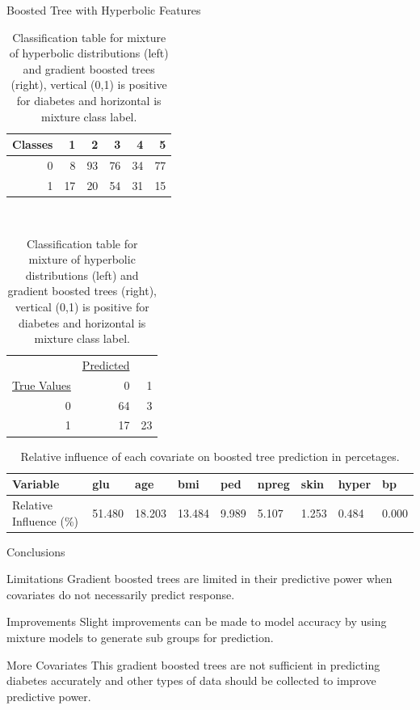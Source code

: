 \documentclass{beamer}
\begin{document}
\begin{frame}{Boosted Tree with Hyperbolic Features}
\begin{tiny}
\begin{table}
\label{classTable}
\caption{Classification table for mixture of hyperbolic distributions (left) and gradient boosted trees (right), vertical (0,1) is positive for diabetes and horizontal is mixture class label.}
\vspace{8pt}
\centering
\begin{tabular}{|r|rrrrr|}
\hline\hline
Classes & 1  & 2  & 3  & 4  & 5  \\
\hline
0       & 8  & 93 & 76 & 34 & 77 \\
1       & 17 & 20 & 54 & 31 & 15 \\ 
\hline \hline
\end{tabular}
$\quad\quad$
\begin{tabular}{|r|rr|}
\hline\hline
          & \underline{Predicted} &   \\
\underline{True Values} & 0         & 1  \\
\hline
0           & 64        & 3  \\
1           & 17        & 23 \\
\hline\hline
\end{tabular}
\end{table}

\begin{table}[!h]
\centering
\label{relInflu}
\caption{Relative influence of each covariate on boosted tree prediction in percetages. }
\vspace{5pt}
\begin{tabular}{|l|llllllll|}
\hline\hline 
Variable                & glu    & age    & bmi    & ped   & npreg & skin  & hyper & bp    \\ 
\hline
Relative Influence (\%) & 51.480 & 18.203 & 13.484 & 9.989 & 5.107 & 1.253 & 0.484 & 0.000  \\
\hline\hline
\end{tabular}
\end{table}
\end{tiny}
\end{frame}

\begin{frame}{Conclusions}
\begin{block}{Limitations}
Gradient boosted trees are limited in their predictive power when covariates do not necessarily predict response.
\end{block}
\begin{block}{Improvements}
Slight improvements can be made to model accuracy by using mixture models to generate sub groups for prediction.
\end{block}
\begin{block}{More Covariates}
This gradient boosted trees are not sufficient in predicting diabetes accurately and other types of data should be collected to improve predictive power. 
\end{block}
\end{frame}
\end{document}
